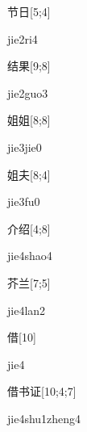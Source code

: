 \begin{verbete}[jie2ri4]{节日}[5;4]
\begin{pronuncia}{jie2ri4}
\end{pronuncia}
\end{verbete}

\begin{verbete}{结果}[9;8]
\begin{pronuncia}{jie2guo3}
\end{pronuncia}
\end{verbete}

\begin{verbete}{姐姐}[8;8]
\begin{pronuncia}{jie3jie0}
\end{pronuncia}
\end{verbete}

\begin{verbete}[jie3fu0]{姐夫}[8;4]
\begin{pronuncia}{jie3fu0}
\end{pronuncia}
\end{verbete}

\begin{verbete}{介绍}[4;8]
\begin{pronuncia}{jie4shao4}
\end{pronuncia}
\end{verbete}

\begin{verbete}{芥兰}[7;5]
\begin{pronuncia}{jie4lan2}
\end{pronuncia}
\end{verbete}

\begin{verbete}[jie4]{借}[10]
\begin{pronuncia}{jie4}
\end{pronuncia}
\end{verbete}

\begin{verbete}{借书证}[10;4;7]
\begin{pronuncia}{jie4shu1zheng4}
\end{pronuncia}
\end{verbete}

